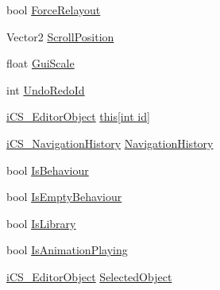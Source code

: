 \begin{DoxyCompactItemize}
\item 
bool \hyperlink{classi_c_s___i_storage_adb98b13f00c6064b061f36a69edfd254}{Force\+Relayout}
\item 
Vector2 \hyperlink{classi_c_s___i_storage_aeb23aad3dd43abe6c8f40a69a6daf05d}{Scroll\+Position}
\item 
float \hyperlink{classi_c_s___i_storage_aa9e9de66bddf52de072550aa139a5e48}{Gui\+Scale}
\item 
int \hyperlink{classi_c_s___i_storage_af56b2357914d469351846e2bbf7af1a7}{Undo\+Redo\+Id}
\item 
\hyperlink{classi_c_s___editor_object}{i\+C\+S\+\_\+\+Editor\+Object} \hyperlink{classi_c_s___i_storage_a529625888b06970683dc18b3de5cfa3a}{this\mbox{[}int id\mbox{]}}
\item 
\hyperlink{classi_c_s___navigation_history}{i\+C\+S\+\_\+\+Navigation\+History} \hyperlink{classi_c_s___i_storage_af9258193e3175cbc5cb7044625da70f9}{Navigation\+History}
\item 
bool \hyperlink{classi_c_s___i_storage_ae13503bb1bdbaaa7ea69c9ff17617ab7}{Is\+Behaviour}
\item 
bool \hyperlink{classi_c_s___i_storage_af1f773de8f74e259c13931edbbef63ab}{Is\+Empty\+Behaviour}
\item 
bool \hyperlink{classi_c_s___i_storage_a354a8da0e974de310a0758bdbf0ce77a}{Is\+Library}
\item 
bool \hyperlink{classi_c_s___i_storage_ad102c86ea0ff74d1d13810d3cb1a6bd8}{Is\+Animation\+Playing}
\item 
\hyperlink{classi_c_s___editor_object}{i\+C\+S\+\_\+\+Editor\+Object} \hyperlink{classi_c_s___i_storage_a7a4f82d3bc11c222c204f5dcbe50bc7e}{Selected\+Object}

\end{DoxyCompactItemize}
